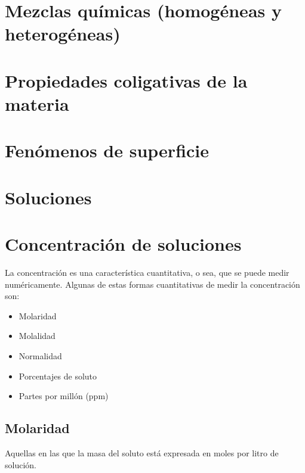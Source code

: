 \section{Mezclas químicas (homogéneas y heterogéneas)}



\section{Propiedades coligativas de la materia}



\section{Fenómenos de superficie}



\section{Soluciones}



\section{Concentración de soluciones}



La concentración es una característica cuantitativa, o sea, que se puede medir numéricamente. Algunas de estas formas cuantitativas de medir la concentración son:

\begin{itemize}
    \item Molaridad
    \item Molalidad
    \item Normalidad
    \item Porcentajes de soluto
    \item Partes por millón (ppm)
\end{itemize}

\subsection{Molaridad}

Aquellas en las que la masa del soluto está expresada en moles por litro de solución.

